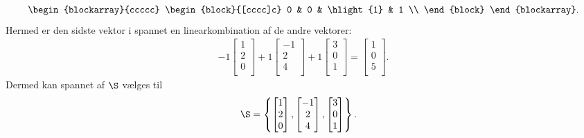 \begin{eks}
\begin{align*}
\begin{blockarray}{ccccc}
\begin{block}{[cccc]c}
  0 & 0 & \hlight{1} & 1 \\
\end{block}
\end{blockarray}.
%
\end{align*}
%
Hermed er den sidste vektor i spannet en linearkombination af de andre vektorer:
%
  \begin{align*}
         -1 \begin{bmatrix}
           1 \\
           2 \\
           0 \\
         \end{bmatrix}
         +1
         \begin{bmatrix}
           -1 \\
           2 \\
           4 \\
         \end{bmatrix}
          +1
         \begin{bmatrix}
           3 \\
           0 \\
           1 \\
         \end{bmatrix}
         =
         \begin{bmatrix}
           1 \\
           0 \\
           5 \\
         \end{bmatrix}.
  \end{align*} 
%
Dermed kan spannet af $\S$ vælges til
%
\begin{align*}
\S &= \left\{
\begin{bmatrix}
           1 \\
           2 \\
           0 \\
\end{bmatrix}
,
\begin{bmatrix}
           -1 \\
           2 \\
           4 \\
\end{bmatrix}
,
\begin{bmatrix}
           3 \\
           0 \\
           1 \\
\end{bmatrix}
\right\}.
\end{align*}
\end{eks}
